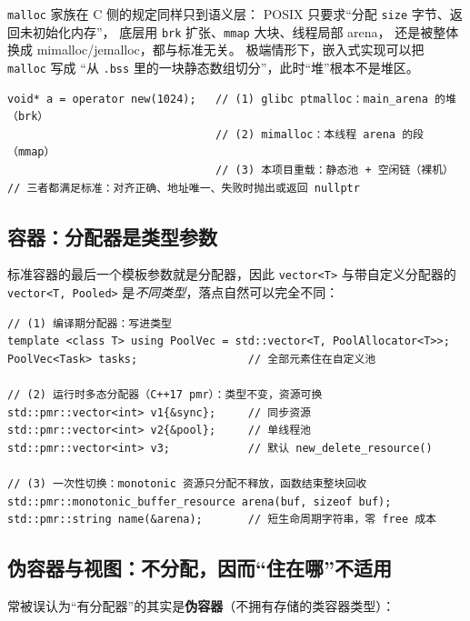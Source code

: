 \documentclass[12pt,a4paper,fontset=fandol]{ctexbook}
\begin{document}
\texttt{malloc} 家族在 C 侧的规定同样只到语义层：
POSIX 只要求``分配 \texttt{size} 字节、返回未初始化内存''，
底层用 \texttt{brk} 扩张、\texttt{mmap} 大块、线程局部 arena，
还是被整体换成 mimalloc/jemalloc，都与标准无关。
极端情形下，嵌入式实现可以把 \texttt{malloc} 写成
``从 \texttt{.bss} 里的一块静态数组切分''，此时``堆''根本不是堆区。

\begin{lstlisting}[caption={同一段代码，三种合法的落点（取决于实现与重载）}]
void* a = operator new(1024);   // (1) glibc ptmalloc：main_arena 的堆（brk）
                                // (2) mimalloc：本线程 arena 的段（mmap）
                                // (3) 本项目重载：静态池 + 空闲链（裸机）
// 三者都满足标准：对齐正确、地址唯一、失败时抛出或返回 nullptr
\end{lstlisting}

\subsection{容器：分配器是类型参数}

标准容器的最后一个模板参数就是分配器，因此
\texttt{vector<T>} 与带自定义分配器的 \texttt{vector<T,\,Pooled>}
是\emph{不同类型}，落点自然可以完全不同：

\begin{lstlisting}
// (1) 编译期分配器：写进类型
template <class T> using PoolVec = std::vector<T, PoolAllocator<T>>;
PoolVec<Task> tasks;                 // 全部元素住在自定义池

// (2) 运行时多态分配器（C++17 pmr）：类型不变，资源可换
std::pmr::vector<int> v1{&sync};     // 同步资源
std::pmr::vector<int> v2{&pool};     // 单线程池
std::pmr::vector<int> v3;            // 默认 new_delete_resource()

// (3) 一次性切换：monotonic 资源只分配不释放，函数结束整块回收
std::pmr::monotonic_buffer_resource arena(buf, sizeof buf);
std::pmr::string name(&arena);       // 短生命周期字符串，零 free 成本
\end{lstlisting}

\subsection{伪容器与视图：不分配，因而``住在哪''不适用}

常被误认为``有分配器''的其实是\textbf{伪容器}（不拥有存储的类容器类型）：
\end{document}
